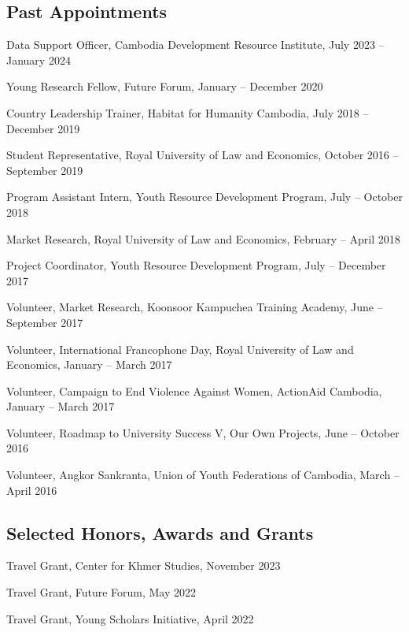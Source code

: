 \documentclass[10pt,a4paper]{article}
\begin{document}
\subsection*{Past Appointments}

	Data Support Officer, Cambodia Development Resource Institute, July 2023 -- January 2024

	Young Research Fellow, Future Forum, January -- December 2020

	Country Leadership Trainer, Habitat for Humanity Cambodia, July 2018 -- December 2019
	
	Student Representative, Royal University of Law and Economics, October 2016 -- September 2019
	
	Program Assistant Intern, Youth Resource Development Program, July -- October 2018
	
	Market Research, Royal University of Law and Economics, February -- April 2018
	
	Project Coordinator, Youth Resource Development Program, July -- December 2017
	
	Volunteer, Market Research, Koonsoor Kampuchea Training Academy, June -- September 2017
	
	Volunteer, International Francophone Day,  Royal University of Law and Economics, January -- March 2017
	
	Volunteer, Campaign to End Violence Against Women, ActionAid Cambodia, January -- March 2017
	
	Volunteer, Roadmap to University Success V, Our Own Projects, June -- October 2016
	
	Volunteer, Angkor Sankranta, Union of Youth Federations of Cambodia, March -- April 2016

\subsection*{Selected Honors, Awards and Grants}

\parindent=0pt
	
	Travel Grant, Center for Khmer Studies, November 2023 %
	
	Travel Grant, Future Forum, May 2022 %
	
	Travel Grant, Young Scholars Initiative, April 2022  %
	
\end{document}
